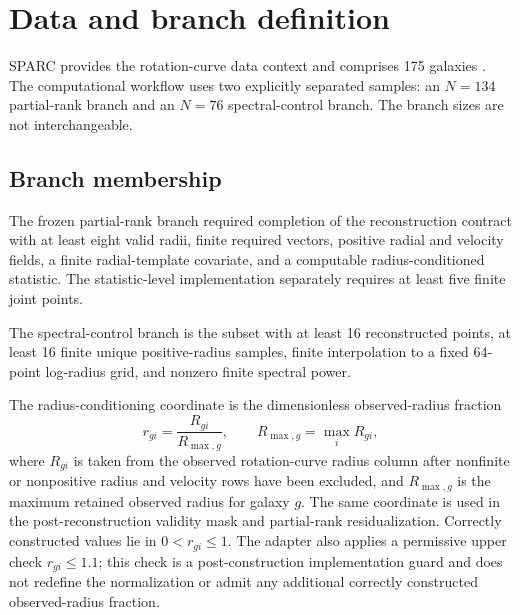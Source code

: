 
\section{Data and branch definition}
\label{sec:data}

SPARC provides the rotation-curve data context and comprises 175 galaxies
\citep{Lelli2016}. The computational workflow uses two explicitly separated
samples: an $N=134$ partial-rank branch and an $N=76$ spectral-control branch.
The branch sizes are not interchangeable.

\subsection{Branch membership}

The frozen partial-rank branch required completion of the reconstruction
contract with at least eight valid radii, finite required vectors, positive
radial and velocity fields, a finite radial-template covariate, and a
computable radius-conditioned statistic. The statistic-level implementation
separately requires at least five finite joint points.

The spectral-control branch is the subset with at least 16 reconstructed
points, at least 16 finite unique positive-radius samples, finite interpolation
to a fixed 64-point log-radius grid, and nonzero finite spectral power.

The radius-conditioning coordinate is the dimensionless observed-radius
fraction
\begin{equation}
r_{gi}=\frac{R_{gi}}{R_{\max,g}},
\qquad
R_{\max,g}=\max_i R_{gi},
\end{equation}
where $R_{gi}$ is taken from the observed rotation-curve radius column after
nonfinite or nonpositive radius and velocity rows have been excluded, and
$R_{\max,g}$ is the maximum retained observed radius for galaxy $g$. The same
coordinate is used in the post-reconstruction validity mask and partial-rank
residualization. Correctly constructed values lie in $0<r_{gi}\leq1$. The
adapter also applies a permissive upper check $r_{gi}\leq1.1$; this check is a
post-construction implementation guard and does not redefine the
normalization or admit any additional correctly constructed observed-radius
fraction.
